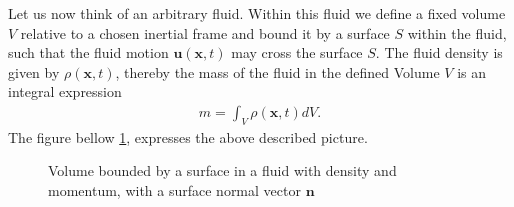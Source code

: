 Let us now think of an arbitrary fluid. Within this fluid we define a fixed
volume $V$ relative to a chosen inertial frame and bound it by a surface $S$
within the fluid, such that the fluid motion $\mathbf{u}(\mathbf{x}, t)$ may
cross the surface $S$. The fluid density is given by $\rho(\mathbf{x}, t)$,
thereby the mass of the fluid in the defined Volume $V$ is an integral
expression
\begin{align}
    m = \int_V \rho(\mathbf{x}, t) dV.
\end{align}
The figure bellow \ref{fig:volume}, expresses the above described picture.
\begin{figure}[H]
    \centering
  \caption{Volume bounded by a surface in a fluid with density and momentum,
  with a surface normal vector $\mathbf{n}$ \label{fig:volume}}
\end{figure}

